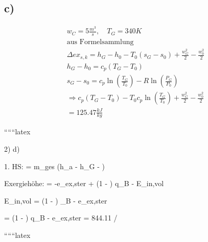 \subsection*{c)}

\begin{align*}
&w_C = 5 \frac{m^3}{s}, \quad T_G = 340K \\
&\text{aus Formelsammlung} \\
&\Delta ex_{s,k} = h_G - h_0 - T_0 (s_G - s_0) + \frac{w_G^2}{2} - \frac{w_0^2}{2} \\
&h_G - h_0 = c_p (T_G - T_0) \\
&s_G - s_0 = c_p \ln \left( \frac{T_G}{T_0} \right) - R \ln \left( \frac{P_G}{P_0} \right) \\
&\Rightarrow c_p (T_G - T_0) - T_0 c_p \ln \left( \frac{T_G}{T_0} \right) + \frac{w_G^2}{2} - \frac{w_0^2}{2} \\
&= 125.47 \frac{kJ}{kg}
\end{align*}

``````latex


2) d)

1. HS:  = m_{ges} (h_{a} - h_{G} - )

Exergiehöhe:  = -e_{ex,ster} + \left(1 - \right) q_{B} - E_{in,vol}

\Rightarrow \quad E_{in,vol} = \left(1 - \right) _{B} - e_{ex,ster} \quad {}

= \left(1 - \right) q_{B} - e_{ex,ster} = 844.11  / 

``````latex


